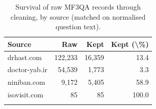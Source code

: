 \begin{table}[h]
\caption{Survival of raw MF3QA records through cleaning, by source (matched on normalised question text).}\label{tab:mf3qa_funnel}
\begin{tabular}{@{}lrrr@{}}
\toprule
Source & Raw & Kept & Kept (\textbackslash{}\%) \\
\midrule
drhast.com & 122,233 & 16,359 & 13.4 \\
doctor-yab.ir & 54,539 & 1,773 & 3.3 \\
niniban.com & 9,172 & 5,405 & 58.9 \\
isovisit.com & 85 & 85 & 100.0 \\
\botrule
\end{tabular}
\end{table}
